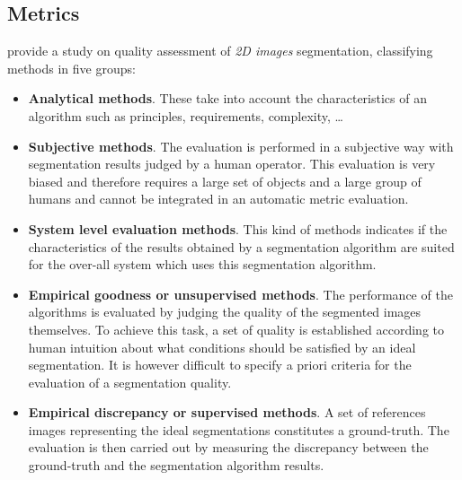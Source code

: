 \documentclass{kththesis}
\begin{document}
\subsection{Metrics} 
 \textcite{Zhang2008ImageSE} provide a study on quality assessment of \textit{2D images} segmentation, classifying methods in five groups: 
\begin{itemize}
    \item \textbf{Analytical methods}. These take into account the characteristics of an algorithm such as principles, requirements, complexity, \dots
    \item \textbf{Subjective methods}. The evaluation is performed in a subjective way with segmentation results judged by a human operator. This evaluation is very biased and therefore requires a large set of objects and a large group of humans and cannot be integrated in an automatic metric evaluation. 
    \item \textbf{System level evaluation methods}. This kind of
methods indicates if the characteristics of the results
obtained by a segmentation algorithm are suited
for the over-all system which uses this segmentation
algorithm. 
    \item \textbf{Empirical goodness or unsupervised methods}. The performance of the algorithms is evaluated
by judging the quality of the segmented images
themselves. To achieve this task, a set of quality
is established
according to human intuition about what conditions
should be satisfied by an ideal segmentation. It is however difficult to specify a priori criteria for the evaluation of a segmentation quality. 
    \item \textbf{Empirical discrepancy or supervised methods}.
    A set of references images representing the ideal segmentations constitutes a ground-truth. The evaluation is then carried out by measuring the discrepancy between the ground-truth and the segmentation algorithm results. 
\end{itemize}
\end{document}
